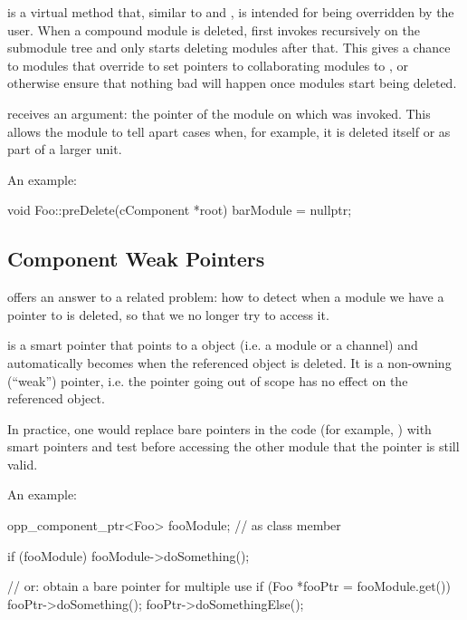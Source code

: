  is a  virtual method that, similar to
 and , is intended for being overridden
by the user. When a compound module is deleted,  first
invokes  recursively on the submodule tree and only starts
deleting modules after that. This gives a chance to modules that override
 to set pointers to collaborating modules to ,
or otherwise ensure that nothing bad will happen once modules start being
deleted.

 receives an argument: the pointer of the module on which
 was invoked. This allows the module to tell apart cases
when, for example, it is deleted itself or as part of a larger unit.

An example:

\begin{cpp}
void Foo::preDelete(cComponent *root)
{
    barModule = nullptr;
}
\end{cpp}


\subsection{Component Weak Pointers}
\label{sec:simple-modules:weak-compontent-ptr}

 offers an answer to a related problem: how to detect
when a module we have a pointer to is deleted, so that we no longer try to
access it.

 is a smart pointer that points to a
 object (i.e. a module or a channel) and automatically
becomes  when the referenced object is deleted. It is a non-owning
(``weak'') pointer, i.e. the pointer going out of scope has no effect on the
referenced object.

In practice, one would replace bare pointers in the code (for example,
) with  smart pointers and test
before accessing the other module that the pointer is still valid.

An example:

\begin{cpp}
opp_component_ptr<Foo> fooModule;  // as class member

if (fooModule)
    fooModule->doSomething();

// or: obtain a bare pointer for multiple use
if (Foo *fooPtr = fooModule.get()) {
    fooPtr->doSomething();
    fooPtr->doSomethingElse();
}
\end{cpp}



